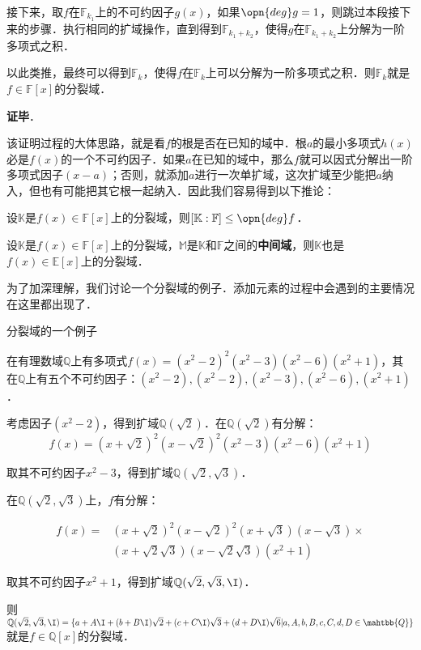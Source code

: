 接下来，取$f$在$\mathbb{F}_{k_1}$上的不可约因子$g(x)$，如果$\opn{deg} g = 1$，则跳过本段接下来的步骤．执行相同的扩域操作，直到得到$\mathbb{F}_{k_1+k_2}$，使得$g$在$\mathbb{F}_{k_1+k_2}$上分解为一阶多项式之积．

以此类推，最终可以得到$\mathbb{F}_k$，使得$f$在$\mathbb{F}_k$上可以分解为一阶多项式之积．则$\mathbb{F}_k$就是$f\in\mathbb{F}[x]$的分裂域．

\textbf{证毕}．

该证明过程的大体思路，就是看$f$的根是否在已知的域中．根$a$的最小多项式$h(x)$必是$f(x)$的一个不可约因子．如果$a$在已知的域中，那么$f$就可以因式分解出一阶多项式因子$(x-a)$；否则，就添加$a$进行一次单扩域，这次扩域至少能把$a$纳入，但也有可能把其它根一起纳入．因此我们容易得到以下推论：

\begin{corollary}{}
设$\mathbb{K}$是$f(x)\in \mathbb{F}[x]$上的分裂域，则$[\mathbb{K}:\mathbb{F}]\leq \opn{deg}f$．
\end{corollary}

\begin{corollary}{}
设$\mathbb{K}$是$f(x)\in \mathbb{F}[x]$上的分裂域，$\mathbb{M}$是$\mathbb{K}$和$\mathbb{F}$之间的\textbf{中间域}，则$\mathbb{K}$也是$f(x)\in \mathbb{E}[x]$上的分裂域．
\end{corollary}

为了加深理解，我们讨论一个分裂域的例子．添加元素的过程中会遇到的主要情况在这里都出现了．

\begin{example}{分裂域的一个例子}


在有理数域$\mathbb{Q}$上有多项式$f(x)=(x^2-2)^2(x^2-3)(x^2-6)(x^2+1)$，其在$\mathbb{Q}$上有五个不可约因子：$(x^2-2), (x^2-2), (x^2-3), (x^2-6), (x^2+1)$．

考虑因子$(x^2-2)$，得到扩域$\mathbb{Q}(\sqrt{2})$．在$\mathbb{Q}(\sqrt{2})$有分解：
\begin{equation}
f(x)=(x+\sqrt{2})^2(x-\sqrt{2})^2(x^2-3)(x^2-6)(x^2+1)
\end{equation}

取其不可约因子$x^2-3$，得到扩域$\mathbb{Q}(\sqrt{2}, \sqrt{3})$．

在$\mathbb{Q}(\sqrt{2}, \sqrt{3})$上，$f$有分解：

\begin{equation}
\begin{aligned}
f(x)=&(x+\sqrt{2})^2(x-\sqrt{2})^2(x+\sqrt{3})(x-\sqrt{3})\times\\
&(x+\sqrt{2}\sqrt{3})(x-\sqrt{2}\sqrt{3})(x^2+1)
\end{aligned}
\end{equation}

取其不可约因子$x^2+1$，得到扩域$\mathbb{Q}(\sqrt{2}, \sqrt{3}, \I)$．

则$\mathbb{Q}(\sqrt{2}, \sqrt{3}, \I)=\{a+A\I+(b+B\I)\sqrt{2}+(c+C\I)\sqrt{3}+(d+D\I)\sqrt{6}|a, A, b, B, c, C, d, D\in\mahtbb{Q}\}$就是$f\in\mathbb{Q}[x]$的分裂域．

\end{example}

